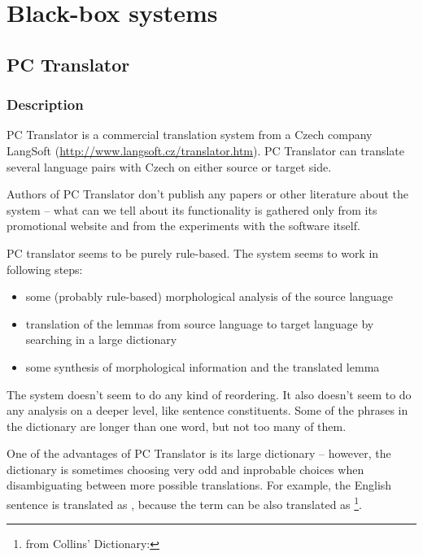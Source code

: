 \chapter{Black-box systems}

\section{PC Translator}

\subsection{Description}

PC Translator is a commercial translation system from a Czech company LangSoft (\url{http://www.langsoft.cz/translator.htm}). PC Translator can translate several language pairs with Czech on either source or target side.

Authors of PC Translator don't publish any papers or other literature about the system -- what can we tell about its functionality is gathered only from its promotional website and from the experiments with the software itself.

PC translator seems to be purely rule-based. The system seems to work in following steps:

\begin{itemize}
\item some (probably rule-based) morphological analysis of the source language
\item translation of the lemmas from source language to target language by searching in a large dictionary
\item some synthesis of morphological information and the translated lemma
\end{itemize}

The system doesn't seem to do any kind of reordering. It also doesn't seem to do any analysis on a deeper level, like sentence constituents. Some of the phrases in the dictionary are longer than one word, but not too many of them.

One of the advantages of PC Translator is its large dictionary -- however, the dictionary is sometimes choosing very odd and inprobable choices when disambiguating between more possible translations. For example, the English sentence  is translated as , because the term  can be also translated as \footnote{from Collins' Dictionary: }.


